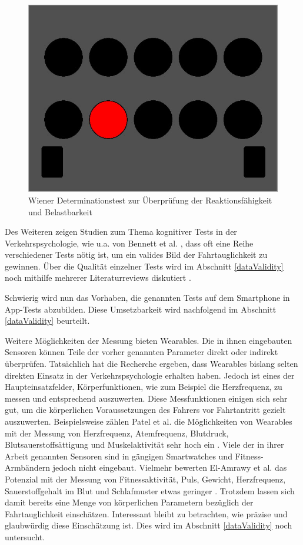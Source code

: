 \begin{figure}[H]
\centering
\includegraphics[width=0.7\linewidth]{images/wiener_dt}
\caption[Caption for parameters]{Wiener Determinationstest zur Überprüfung der Reaktionsfähigkeit und Belastbarkeit\footnotemark}
\label{fig:wiener_dt}
\end{figure}

Des Weiteren zeigen Studien zum Thema kognitiver Tests in der Verkehrspsychologie, wie u.a. von Bennett et al. \cite{cognitivetestsfitnesstodrive}, dass oft eine Reihe verschiedener Tests nötig ist, um ein valides Bild der Fahrtauglichkeit zu gewinnen. Über die Qualität einzelner Tests wird im Abschnitt \ref{dataValidity} noch mithilfe mehrerer Literaturreviews diskutiert \cite{cognitivetestsfitnesstodrive,reviewofassessmenttests1,reviewofassessmenttests2}.

Schwierig wird nun das Vorhaben, die genannten Tests auf dem Smartphone in App-Tests abzubilden. Diese Umsetzbarkeit wird nachfolgend im Abschnitt \ref{dataValidity} beurteilt.

Weitere Möglichkeiten der Messung bieten Wearables. Die in ihnen eingebauten Sensoren können Teile der vorher genannten Parameter direkt oder indirekt überprüfen. Tatsächlich hat die Recherche ergeben, dass Wearables bislang selten direkten Einsatz in der Verkehrspsychologie erhalten haben. Jedoch ist eines der Haupteinsatzfelder, Körperfunktionen, wie zum Beispiel die Herzfrequenz, zu messen und entsprechend auszuwerten. Diese Messfunktionen einigen sich sehr gut, um die körperlichen Voraussetzungen des Fahrers vor Fahrtantritt gezielt auszuwerten. Beispielsweise zählen Patel et al. die Möglichkeiten von Wearables mit der Messung von Herzfrequenz, Atemfrequenz, Blutdruck, Blutsauerstoffsättigung und Muskelaktivität sehr hoch ein \cite{reviewwearablesensors}. Viele der in ihrer Arbeit genannten Sensoren sind in gängigen Smartwatches und Fitness-Armbändern jedoch nicht eingebaut. Vielmehr bewerten  El-Amrawy et al. das Potenzial mit der Messung von Fitnessaktivität, Puls, Gewicht, Herzfrequenz, Sauerstoffgehalt im Blut und Schlafmuster etwas geringer \cite{wearabletracking}. Trotzdem lassen sich damit bereits eine Menge von körperlichen Parametern bezüglich der Fahrtauglichkeit einschätzen. Interessant bleibt zu betrachten, wie präzise und glaubwürdig diese Einschätzung ist. Dies wird im Abschnitt \ref{dataValidity} noch untersucht.

